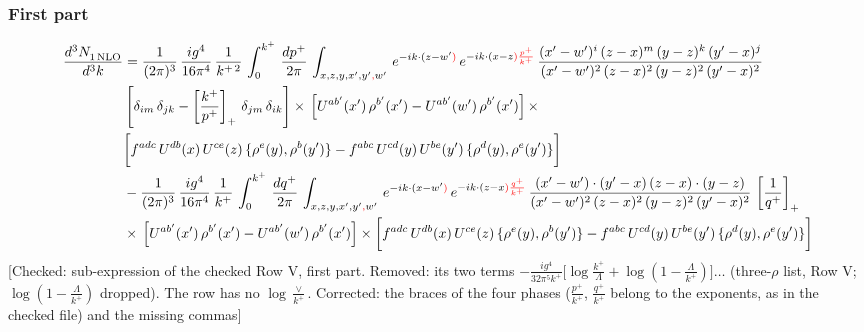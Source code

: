 \documentclass[9pt]{article}
\numberwithin{equation}{section}
\begin{document}
\subsubsection*{First part}
\begin{align}
     \frac{d^{3}N_{1\,\rm NLO}^{\rm}}{d^{3}k}  & =  \frac{1}{(2\pi)^{3}}\, \frac{ig^{4}}{16\pi^{4}}\, \frac{1}{k^{+\,2}}\,\int_{0}^{k^{+}}\, \frac{dp^{+}}{2\pi}\,\int_{x,z,y,x',y'{\color{red},}w'}\,e^{-ik\cdot (z-w^\prime{\color{red})}}\,e^{-ik\cdot (x-z{\color{red})\frac{p^{+}}{k^{+}}}}\,\frac{(x'-w')^{i}\,(z-x)^{m}\,(y-z)^{k}\,(y'-x)^{j}}{(x'-w')^{2}\,(z-x)^{2}\,(y-z)^{2}\,(y'-x)^{2}}\,\notag \\ & \left[\delta_{im}\,\delta_{jk}-\left[\frac{k^{+}}{p^{+}}\right]_{+}\, \delta_{jm}\,\delta_{ik}\right]\times\, \left[U^{ab'}(x')\,\rho^{b'}(x')-U^{ab'}(w')\,\rho^{b'}(x')\right]\times\notag \\ & \bigg[f^{adc}\,U^{db}(x)\,U^{ce}(z)\, \{\rho^{e}(y),\rho^{b}(y')\}-f^{abc}\,U^{cd}(y)\,U^{be}(y')\, \{\rho^{d}(y),\rho^{e}(y')\}\bigg] \notag \\ & -\frac{1}{(2\pi)^{3}}\, \frac{ig^{4}}{16\pi^{4}}\, \frac{1}{k^{+}}\,\int_{0}^{k^{+}}\, \frac{dq^{+}}{2\pi}\,\int_{x,z,y,x',y'{\color{red},}w'}\,e^{-ik\cdot (x-w^\prime{\color{red})}}\,e^{-ik\cdot (z-x{\color{red})\frac{q^{+}}{k^{+}}}}\,\frac{(x'-w')\cdot (y'-x)\,(z-x)\cdot (y-z)}{(x'-w')^{2}\,(z-x)^{2}\,(y-z)^{2}\,(y'-x)^{2}}\,\left[\frac{1}{q^{+}}\right]_{+}\notag \\ & \times\, \left[U^{ab'}(x')\,\rho^{b'}(x')-U^{ab'}(w')\,\rho^{b'}(x')\right]\times \bigg[f^{adc}\,U^{db}(x)\,U^{ce}(z)\, \{\rho^{e}(y),\rho^{b}(y')\}-f^{abc}\,U^{cd}(y)\,U^{be}(y')\, \{\rho^{d}(y),\rho^{e}(y')\}\bigg]
\end{align} {\color{red}[Checked: sub-expression of the checked Row V, first part. Removed: its two terms $-\frac{ig^{4}}{32\pi^{5}k^{+}}\big[\log\frac{k^{+}}{\Lambda}+\log(1-\frac{\Lambda}{k^{+}})\big]\dots$ (three-$\rho$ list, Row V; $\log(1-\frac{\Lambda}{k^{+}})$ dropped). The row has no $\log\frac{\vee}{k^{+}}$. Corrected: the braces of the four phases ($\frac{p^{+}}{k^{+}}$, $\frac{q^{+}}{k^{+}}$ belong to the exponents, as in the checked file) and the missing commas]}\par\noindent
\end{document}
